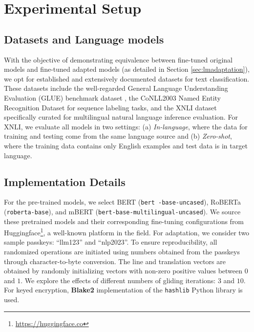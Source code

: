 \documentclass[letterpaper]{article} %
\begin{document}
\section{Experimental Setup}
\label{sec:expsetup}

\subsection{Datasets and Language models}
With the objective of demonstrating equivalence between fine-tuned original models and fine-tuned adapted models (as detailed in Section \ref{sec:lmadaptation}), we opt for established and extensively documented datasets for text classification. These datasets include the well-regarded General Language Understanding Evaluation (GLUE) benchmark dataset \cite{wang2018glue}, the CoNLL2003 Named Entity Recognition Dataset \cite{sang2003introduction} for sequence labeling tasks, and the XNLI dataset \cite{conneau2018xnli} specifically curated for multilingual natural language inference evaluation. For XNLI, we evaluate all models in two settings: (a) \textit{In-language}, where the data for training and testing come from the same language source and (b) \textit{Zero-shot}, where the training data contains only English examples and test data is in target language.
\subsection{Implementation Details}
For the pre-trained models, we select BERT (\texttt{bert -base-uncased}), RoBERTa (\texttt{roberta-base}), and mBERT (\texttt{bert-base-multilingual-uncased}). We source these pretrained models and their corresponding fine-tuning configurations from Huggingface\footnote{\url{https://huggingface.co}}, a well-known platform in the field. For adaptation, we consider two sample passkeys: ``llm123'' and ``nlp2023''. To ensure reproducibility, all randomized operations are initiated using numbers obtained from the passkeys through character-to-byte conversion. The line and translation vectors are obtained by randomly initializing vectors with non-zero positive values between $0$ and $1$. We explore the effects of different numbers of gliding iterations: $3$ and $10$. For keyed encryption, \textbf{Blake2} implementation of the \texttt{hashlib} Python library is used.
\end{document}
